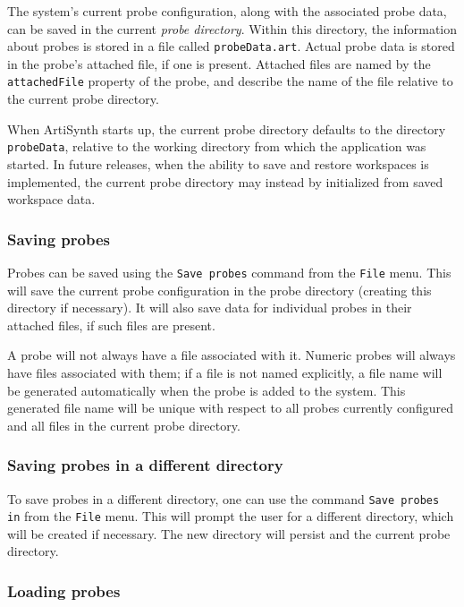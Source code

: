 \documentclass{article}
\begin{document}
The system's current probe configuration, along with the associated
probe data, can be saved in the current {\it probe directory}. Within
this directory, the information about probes is stored in a file
called {\tt probeData.art}. Actual probe data is stored in the probe's
attached file, if one is present.  Attached files are named by the
{\tt attachedFile} property of the probe, and describe the name of
the file relative to the current probe directory.

When ArtiSynth starts up, the current probe directory defaults to the
directory {\tt probeData}, relative to the working directory from
which the application was started. In future releases, when the
ability to save and restore workspaces is implemented, the current
probe directory may instead by initialized from saved workspace data.

\subsubsection{Saving probes}

Probes can be saved using the {\tt Save probes} command from the 
{\tt File} menu. This will save the current probe configuration in the
probe directory (creating this directory if necessary). It will also
save data for individual probes in their attached files, if such files
are present. 

A probe will not always have a file associated with it. Numeric probes
will always have files associated with them; if a file is not named
explicitly, a file name will be generated automatically when the probe
is added to the system. This generated file name will be unique with
respect to all probes currently configured and all files in the
current probe directory.

\subsubsection{Saving probes in a different directory}

To save probes in a different directory, one can use the command 
{\tt Save probes in} from the {\tt File} menu. This will prompt the user
for a different directory, which will be created if necessary.
The new directory will persist and the current probe directory.

\subsubsection{Loading probes}
\end{document}
